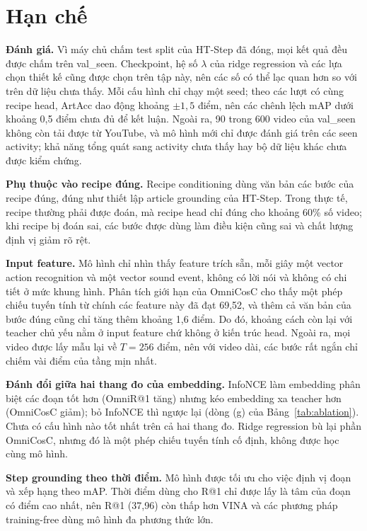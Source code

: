 \documentclass{IEEEtran}
\begin{document}
\section{Hạn chế}
\label{sec:limits}
\textbf{Đánh giá.} Vì máy chủ chấm test split của HT-Step đã đóng, mọi kết quả đều được chấm trên val\_seen. Checkpoint, hệ số $\lambda$ của ridge regression và các lựa chọn thiết kế cũng được chọn trên tập này, nên các số có thể lạc quan hơn so với trên dữ liệu chưa thấy. Mỗi cấu hình chỉ chạy một seed; theo các lượt có cùng recipe head, ArtAcc dao động khoảng $\pm 1{,}5$ điểm, nên các chênh lệch mAP dưới khoảng 0,5 điểm chưa đủ để kết luận. Ngoài ra, 90 trong 600 video của val\_seen không còn tải được từ YouTube, và mô hình mới chỉ được đánh giá trên các seen activity; khả năng tổng quát sang activity chưa thấy hay bộ dữ liệu khác chưa được kiểm chứng.

\textbf{Phụ thuộc vào recipe đúng.} Recipe conditioning dùng văn bản các bước của recipe đúng, đúng như thiết lập article grounding của HT-Step. Trong thực tế, recipe thường phải được đoán, mà recipe head chỉ đúng cho khoảng 60\% số video; khi recipe bị đoán sai, các bước được dùng làm điều kiện cũng sai và chất lượng định vị giảm rõ rệt.

\textbf{Input feature.} Mô hình chỉ nhìn thấy feature trích sẵn, mỗi giây một vector action recognition và một vector sound event, không có lời nói và không có chi tiết ở mức khung hình. Phân tích giới hạn của OmniCosC cho thấy một phép chiếu tuyến tính từ chính các feature này đã đạt 69,52, và thêm cả văn bản của bước đúng cũng chỉ tăng thêm khoảng 1,6 điểm. Do đó, khoảng cách còn lại với teacher chủ yếu nằm ở input feature chứ không ở kiến trúc head. Ngoài ra, mọi video được lấy mẫu lại về $T = 256$ điểm, nên với video dài, các bước rất ngắn chỉ chiếm vài điểm của tầng mịn nhất.

\textbf{Đánh đổi giữa hai thang đo của embedding.} InfoNCE làm embedding phân biệt các đoạn tốt hơn (OmniR@1 tăng) nhưng kéo embedding xa teacher hơn (OmniCosC giảm); bỏ InfoNCE thì ngược lại (dòng (g) của Bảng~\ref{tab:ablation}). Chưa có cấu hình nào tốt nhất trên cả hai thang đo. Ridge regression bù lại phần OmniCosC, nhưng đó là một phép chiếu tuyến tính cố định, không được học cùng mô hình.

\textbf{Step grounding theo thời điểm.} Mô hình được tối ưu cho việc định vị đoạn và xếp hạng theo mAP. Thời điểm dùng cho R@1 chỉ được lấy là tâm của đoạn có điểm cao nhất, nên R@1 (37,96) còn thấp hơn VINA và các phương pháp training-free dùng mô hình đa phương thức lớn.
\end{document}
